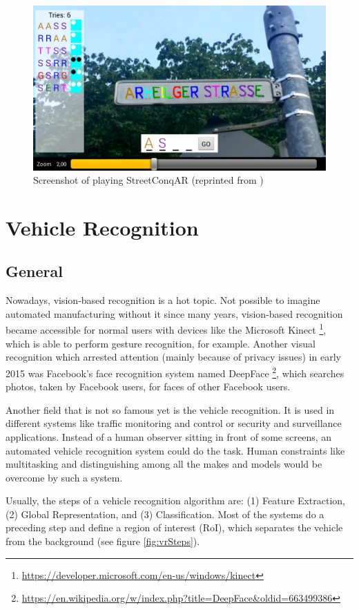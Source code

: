 \begin{figure}[bth]
  \centering
        \includegraphics[width=.65\linewidth]{gfx/streetconqar_gameplay_reprint}
        \caption{Screenshot of playing StreetConqAR (reprinted from \citep{hock2014augmented})}
        \label{fig:streetConqARGameplay}
\end{figure}


\section{Vehicle Recognition}

\subsection{General}
Nowadays, vision-based recognition is a hot topic. Not possible to imagine automated manufacturing without it since many years, vision-based recognition became accessible for normal users with devices like the Microsoft Kinect \footnote{\url{https://developer.microsoft.com/en-us/windows/kinect}}, which is able to perform gesture recognition, for example. Another visual recognition which arrested attention (mainly because of privacy issues) in early 2015 was Facebook's face recognition system named DeepFace \footnote{\url{https://en.wikipedia.org/w/index.php?title=DeepFace&oldid=663499386}}, which searches photos, taken by Facebook users, for faces of other Facebook users.

Another field that is not so famous yet is the vehicle recognition. It is used in different systems like traffic monitoring and control or security and surveillance applications. Instead of a human observer sitting in front of some screens, an automated vehicle recognition system could do the task. Human constraints like multitasking and distinguishing among all the makes and models would be overcome by such a system.

Usually, the steps of a vehicle recognition algorithm are: (1) Feature Extraction, (2) Global Representation, and (3) Classification. Most of the systems do a preceding step and define a region of interest (RoI), which separates the vehicle from the background (see figure \ref{fig:vrSteps}).

